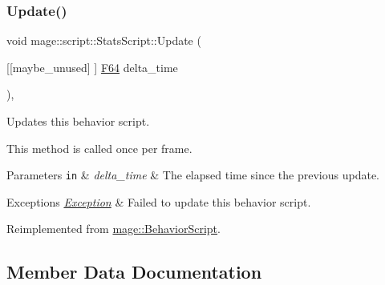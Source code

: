\hypertarget{classmage_1_1script_1_1_stats_script_a0af94632cf9d5c32ae45799a2348c571}{}\label{classmage_1_1script_1_1_stats_script_a0af94632cf9d5c32ae45799a2348c571} 
\subsubsection{\texorpdfstring{Update()}{Update()}}
{\footnotesize\ttfamily void mage\+::script\+::\+Stats\+Script\+::\+Update (\begin{DoxyParamCaption}\item[{\mbox{[}\mbox{[}maybe\+\_\+unused\mbox{]} \mbox{]} \hyperlink{namespacemage_ad26233bbec640deda836e572c1a23708}{F64}}]{delta\+\_\+time }\end{DoxyParamCaption})\hspace{0.3cm}{\ttfamily [override]}, {\ttfamily [virtual]}}

Updates this behavior script.

This method is called once per frame.


\begin{DoxyParams}[1]{Parameters}
\mbox{\tt in}  & {\em delta\+\_\+time} & The elapsed time since the previous update. \\
\hline
\end{DoxyParams}

\begin{DoxyExceptions}{Exceptions}
{\em \hyperlink{classmage_1_1_exception}{Exception}} & Failed to update this behavior script. \\
\hline
\end{DoxyExceptions}


Reimplemented from \hyperlink{classmage_1_1_behavior_script_afb9cf3759edf8876416d1df85489cba6}{mage\+::\+Behavior\+Script}.



\subsection{Member Data Documentation}
\hypertarget{classmage_1_1script_1_1_stats_script_a7ef910aceb585af53110697ea5b3f810}{}\label{classmage_1_1script_1_1_stats_script_a7ef910aceb585af53110697ea5b3f810} 
